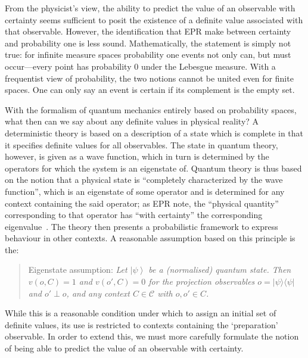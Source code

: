 \documentclass[11pt, a4paper]{article}
\theoremstyle{definition}
\newcommand{\ket}[1]{\left| #1 \right>}
\newcommand{\oprod}[2]{| #1 \rangle\langle #2 |}
\begin{document}
From the physicist's view, the ability to predict the value of an observable with certainty seems sufficient to posit the existence of a definite value associated with that observable. However, the identification that EPR make between certainty and probability one is less sound. Mathematically, the statement is simply not true: for infinite  measure spaces probability one events not only can, but must occur---every point has probability 0 under the Lebesgue measure. With a frequentist view of probability, the two notions cannot be united even for finite spaces. One can only say an event is certain if its complement is the empty set.

With the formalism of quantum mechanics entirely based on probability spaces, what then can we say about any definite values in physical reality? A deterministic theory is based on a description of a state which is complete in that it specifies definite values for all observables. The state in quantum theory, however, is given as a wave function, which in turn is determined by the operators for which the system is an eigenstate of. Quantum theory is thus based on the notion that a physical state is ``completely characterized by the wave function'', which is an eigenstate of some operator and is determined for any context containing the said operator; as EPR note, the ``physical quantity'' corresponding to that operator has ``with certainty'' the corresponding eigenvalue~\cite[pp. 778]{epr}. The theory then presents a probabilistic framework to express behaviour in other contexts.
A reasonable assumption based on this principle is the:

\begin{quote}
Eigenstate assumption:  {\em Let $\ket{\psi}$ be a (normalised) quantum state. Then $v(o,C)=1$ and $v(o',C)=0$ for the projection observables $o=\oprod{\psi}{\psi}$ and $o'\perp o$, and any context $C\in\mathcal{C}$ with $o,o'\in C$.}
\end{quote}

While this is a reasonable condition under which to assign an initial set of definite values, its use is restricted to contexts containing the `preparation' observable. In order to extend this, we must more carefully formulate the notion of being able to predict the value of an observable with certainty.

\end{document}
